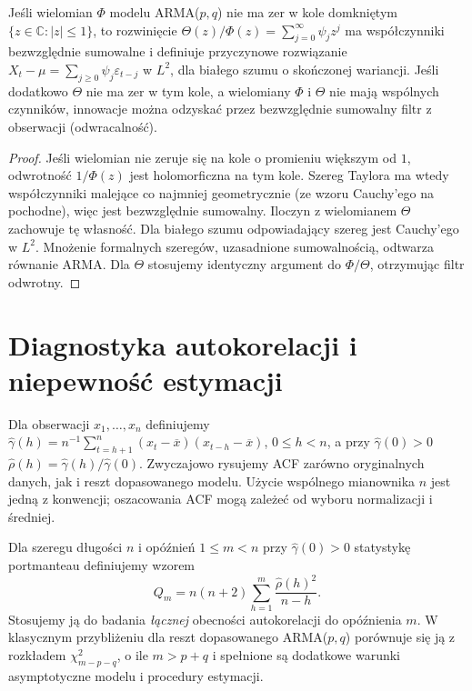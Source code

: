 \begin{stwierdzenie}
Jeśli wielomian $\Phi$ modelu ARMA($p,q$) nie ma zer
w kole domkniętym $\{z\in\mathbb C:|z|\le1\}$,
to rozwinięcie $\Theta(z)/\Phi(z)=\sum_{j=0}^\infty\psi_jz^j$
ma współczynniki bezwzględnie sumowalne i definiuje
przyczynowe rozwiązanie
$X_t-\mu=\sum_{j\ge0}\psi_j\varepsilon_{t-j}$
w $L^2$, dla białego szumu o skończonej wariancji.
Jeśli dodatkowo $\Theta$ nie ma zer w tym kole,
a wielomiany $\Phi$ i $\Theta$ nie mają wspólnych czynników,
innowacje można odzyskać przez bezwzględnie sumowalny
filtr z obserwacji (odwracalność).
\end{stwierdzenie}
\begin{proof}
Jeśli wielomian nie zeruje się na kole o promieniu
większym od $1$, odwrotność $1/\Phi(z)$ jest
holomorficzna na tym kole. Szereg Taylora ma wtedy
współczynniki malejące co najmniej geometrycznie
(ze wzoru Cauchy'ego na pochodne), więc jest
bezwzględnie sumowalny. Iloczyn z wielomianem
$\Theta$ zachowuje tę własność. Dla białego szumu
odpowiadający szereg jest Cauchy'ego w $L^2$.
Mnożenie formalnych szeregów, uzasadnione
sumowalnością, odtwarza równanie ARMA.
Dla $\Theta$ stosujemy identyczny argument do
$\Phi/\Theta$, otrzymując filtr odwrotny.
\end{proof}

\section{Diagnostyka autokorelacji i niepewność estymacji}
Dla obserwacji $x_1,\ldots,x_n$ definiujemy
$\widehat\gamma(h)=n^{-1}\sum_{t=h+1}^n
(x_t-\overline x)(x_{t-h}-\overline x)$,
$0\le h<n$, a przy $\widehat\gamma(0)>0$
$\widehat\rho(h)=\widehat\gamma(h)/\widehat\gamma(0)$.
Zwyczajowo rysujemy ACF zarówno oryginalnych danych,
jak i reszt dopasowanego modelu. Użycie wspólnego
mianownika $n$ jest jedną z konwencji; oszacowania ACF
mogą zależeć od wyboru normalizacji i średniej.

\begin{definicja}
Dla szeregu długości $n$ i opóźnień $1\le m<n$
przy $\widehat\gamma(0)>0$ statystykę portmanteau
definiujemy wzorem
\[
 Q_m=n(n+2)\sum_{h=1}^{m}\frac{\widehat\rho(h)^2}{n-h}.
\]
Stosujemy ją do badania \emph{łącznej} obecności
autokorelacji do opóźnienia $m$. W klasycznym
przybliżeniu dla reszt dopasowanego ARMA($p,q$)
porównuje się ją z rozkładem $\chi^2_{m-p-q}$,
o ile $m>p+q$ i spełnione są dodatkowe warunki
asymptotyczne modelu i procedury estymacji.
\end{definicja}

